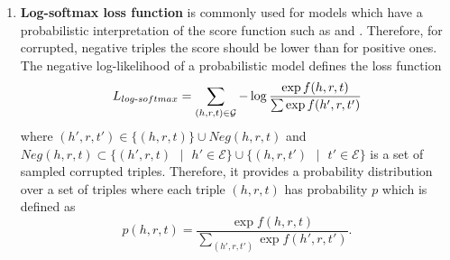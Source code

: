 \begin{enumerate}
    \item 
    \textbf{Log-softmax loss function} is commonly used for models which have a probabilistic interpretation of the score function such as \distmult and \complex.
    Therefore, for corrupted, negative triples the score should be lower than for positive ones.
    The negative log-likelihood of a probabilistic model defines the loss function \cite{cai2017kbgan}
    \begin{equation} \label{eq:nllloss}
        L_{log\text{-}softmax}=\sum_{(h,r,t)\in\mathcal{G}}-\log \frac{\exp f(h,r,t)}{\sum\exp f(h',r,t')}
    \end{equation}
    where $(h',r,t') \in \{(h,r,t)\} \cup Neg(h,r,t)$ and $Neg(h,r,t) \subset \{(h',r,t) \text{ }|\text{ }h' \in \mathcal{E}\} \cup \{(h,r,t')\text{ } |\text{ }t' \in \mathcal{E}\}$ is a set of sampled corrupted triples.
    Therefore, it provides a probability distribution over a set of triples where each triple $(h, r, t)$ has probability $p$ which is defined as \cite{cai2017kbgan}
    \begin{equation}
        p(h,r,t) = \frac{\exp f(h,r,t)}{\sum_{(h',r,t')}\exp f(h',r,t')}.
    \end{equation}
\end{enumerate}
\clearpage